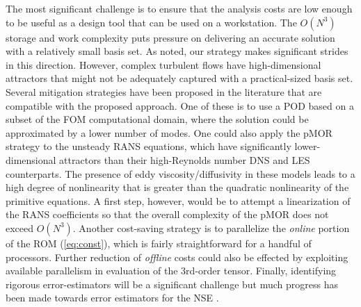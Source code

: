 


The most significant challenge is to ensure that the analysis costs
are low enough to be useful as a design tool that can be used on a
workstation.  The $O(N^3)$ storage and work complexity puts pressure on
delivering an accurate solution with a relatively small basis set.  As noted,
our strategy makes significant strides in this direction.  However, 
complex turbulent flows have high-dimensional attractors that might not
be adequately captured with a practical-sized basis set.  Several
mitigation strategies have been proposed in the literature that are
compatible with the proposed approach.  One of these is to use a POD
based on a subset of the FOM computational domain, where the solution
could be approximated by a lower number of modes.   
    One could also apply the pMOR strategy to the unsteady
RANS equations, which have significantly lower-dimensional attractors
than their high-Reynolds number DNS and LES counterparts.  
The presence of eddy viscosity/diffusivity in these models leads to
a high degree of nonlinearity that is greater than the quadratic
nonlinearity of the primitive equations.  A first step, however, would
be to attempt a linearization of the RANS coefficients so that the
overall complexity of the pMOR does not exceed $O(N^3)$.
  Another cost-saving strategy is to parallelize the {\em online} portion of
the ROM (\ref{eq:const}), which is fairly straightforward for a handful of
processors.  Further reduction of {\em offline} costs could also be effected
by exploiting available parallelism in evaluation of the 3rd-order tensor.
   Finally, identifying rigorous error-estimators will be a 
significant challenge but much progress has been made towards
error estimators for the NSE \cite{fick18,patera05}.
